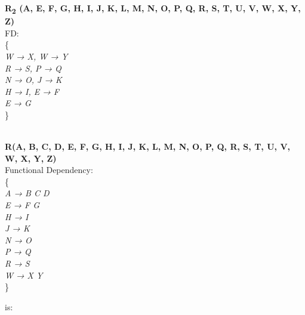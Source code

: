 \begin{adjustwidth}{2cm}{}
\textbf{R\textsubscript{2} (A, E, F, G, H, I, J, K, L, M, N, O, P, Q, R, S, T, U, V, W, X, Y, Z)}\\
FD:\\ 
\{ \\ 
\textit{
W → X, W → Y\\
R → S, P → Q\\
N → O, J → K\\
H → I, E → F\\
E → G\\
}
\}\\ \\
\end{adjustwidth} 















\begin{adjustwidth}{2cm}{}
\textbf{R(A, B, C, D, E, F, G, H, I, J, K, L, M, N, O, P, Q, R, S, T, U, V, W, X, Y, Z)}\\
Functional Dependency:\\
\{\\
\textit{
A → B C D\\
E → F G\\
H → I\\
J → K\\
N → O\\
P → Q\\
R → S\\
W → X Y\\
} 
\}\\
\end{adjustwidth}
is:

